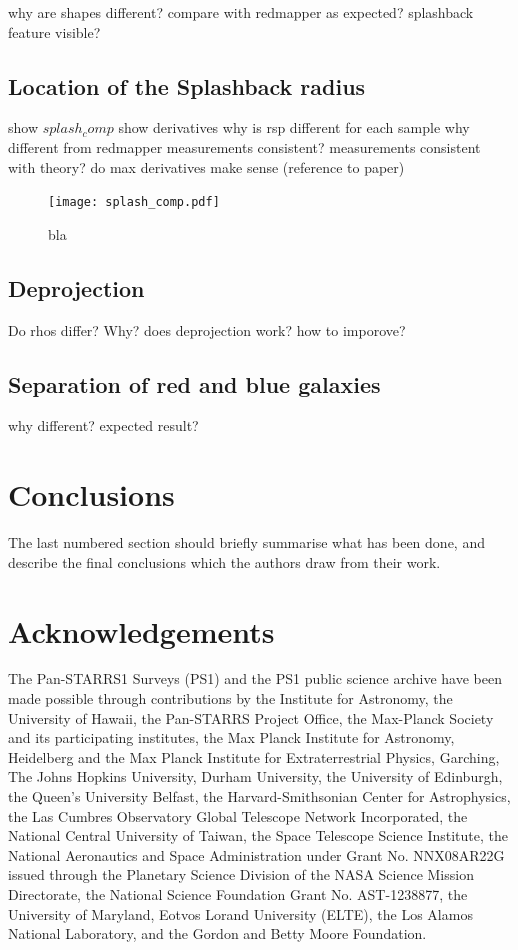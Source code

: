 \documentclass[a4paper,fleqn,usenatbib]{mnras}
\begin{document}
why are shapes different?
compare with redmapper
as expected? splashback feature visible?

\subsection{Location of the Splashback radius}
show $splash_comp$
show derivatives
why is rsp different for each sample
why different from redmapper
measurements consistent?
measurements consistent with theory?
do max derivatives make sense (reference to paper)

\begin{figure}
    \texttt{[image: splash\_comp.pdf]}
\caption{bla}
   \label{fig:splash_comp} 
\end{figure}


\subsection{Deprojection}

Do rhos differ? Why?
does deprojection work?
how to imporove?

\subsection{Separation of red and blue galaxies}
why different?
expected result?


\section{Conclusions}

The last numbered section should briefly summarise what has been done, and describe
the final conclusions which the authors draw from their work.

\section*{Acknowledgements}
The Pan-STARRS1 Surveys (PS1) and the PS1 public science archive have been made possible through contributions by the Institute for Astronomy, the University of Hawaii, the Pan-STARRS Project Office, the Max-Planck Society and its participating institutes, the Max Planck Institute for Astronomy, Heidelberg and the Max Planck Institute for Extraterrestrial Physics, Garching, The Johns Hopkins University, Durham University, the University of Edinburgh, the Queen's University Belfast, the Harvard-Smithsonian Center for Astrophysics, the Las Cumbres Observatory Global Telescope Network Incorporated, the National Central University of Taiwan, the Space Telescope Science Institute, the National Aeronautics and Space Administration under Grant No. NNX08AR22G issued through the Planetary Science Division of the NASA Science Mission Directorate, the National Science Foundation Grant No. AST-1238877, the University of Maryland, Eotvos Lorand University (ELTE), the Los Alamos National Laboratory, and the Gordon and Betty Moore Foundation.
\end{document}
